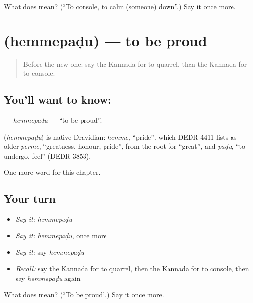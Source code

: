 \begin{tcolorbox}[breakable,colback=teal!4,colframe=teal!35!black,title={Before you move on}]
What does   mean? (\textquotedblleft{}To console, to calm (someone) down\textquotedblright{}.) Say it once more.
\end{tcolorbox}
\section[\texorpdfstring{\kn{ಹೆಮ್ಮೆಪಡು} (hemmepaḍu)}{ಹೆಮ್ಮೆಪಡು (hemmepaḍu)}]{ (hemmepaḍu) — to be proud}

\label{lesson:KA-C276-hemmepadu}



\begin{quote}
Before the new one: say the Kannada for to quarrel, then the Kannada for to console.
\end{quote}

\subsection*{You'll want to know: }
\textbf{} — \emph{hemmepaḍu} — \textquotedblleft{}to be proud\textquotedblright{}.

\begin{cousinweb}
\textbf{} (\emph{hemmepaḍu}) is native Dravidian: \emph{hemme}, \textquotedblleft{}pride\textquotedblright{}, which DEDR 4411 lists as older \emph{perme}, \textquotedblleft{}greatness, honour, pride\textquotedblright{}, from the root for \textquotedblleft{}great\textquotedblright{}, and \emph{paḍu}, \textquotedblleft{}to undergo, feel\textquotedblright{} (DEDR 3853).
\end{cousinweb}

\begin{grammarlens}[title={What you've built}]
One more word for this chapter.
\end{grammarlens}

\subsection*{Your turn}
\begin{itemize}
\raggedright
  \item \emph{Say it:} \emph{hemmepaḍu}
  \item \emph{Say it:} \emph{hemmepaḍu}, once more
  \item \emph{Say it:} say \emph{hemmepaḍu}
  \item \emph{Recall:} say the Kannada for to quarrel, then the Kannada for to console, then say \emph{hemmepaḍu} again
\end{itemize}

\begin{tcolorbox}[breakable,colback=teal!4,colframe=teal!35!black,title={Before you move on}]
What does  mean? (\textquotedblleft{}To be proud\textquotedblright{}.) Say it once more.
\end{tcolorbox}
